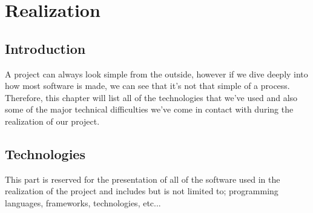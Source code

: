 \chapter{Realization}
\minitoc
\newpage

\setcounter{secnumdepth}{0} %
\section{Introduction}
A project can always look simple from the outside, however if we dive deeply into how most software is made, we can see that it's not that simple of a process.
Therefore, this chapter will list all of the technologies that we've used and also some of the major technical difficulties we've come in contact with during the realization of our project.

\setcounter{secnumdepth}{2} %
\section{Technologies}
This part is reserved for the presentation of all of the software used in the realization of the project and includes but is not limited to; programming languages, frameworks, technologies, etc...

